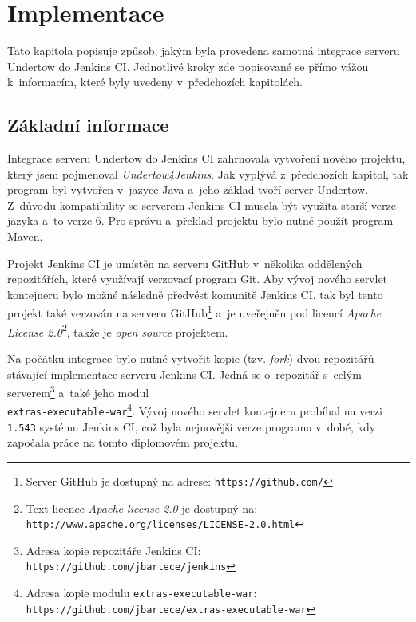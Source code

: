 \chapter{Implementace}  \label{kapImpl}
    Tato kapitola popisuje způsob, jakým byla provedena samotná integrace serveru Undertow do Jenkins CI.
    Jednotlivé kroky zde popisované se přímo vážou k~informacím, které byly uvedeny v~předchozích kapitolách.

    

    
    \section{Základní informace}
        Integrace serveru Undertow do Jenkins CI zahrnovala vytvoření nového projektu, který 
        jsem pojmenoval \emph{Undertow4Jenkins}. 
        Jak vyplývá z~předchozích kapitol, tak program byl vytvořen v~jazyce Java a~jeho základ 
        tvoří server Undertow. 
        Z~důvodu kompatibility se serverem Jenkins CI musela být využita starší verze jazyka a~to verze 6.
        Pro správu a~překlad projektu bylo nutné použít program Maven. 
        
        Projekt Jenkins CI je umístěn na serveru GitHub v~několika oddělených repozitářích, které
        využívají verzovací program Git. Aby vývoj nového servlet kontejneru bylo možné následně předvést 
        komunitě Jenkins CI, tak byl tento projekt také verzován na serveru GitHub\footnote{Server GitHub je 
        dostupný na adrese: \texttt{https://github.com/}} 
        a~je uveřejněn pod licencí \emph{Apache License 2.0}\footnote{Text licence \emph{Apache license 2.0} je dostupný na: 
        \texttt{http://www.apache.org/licenses/LICENSE-2.0.html}}, takže je \emph{open source} projektem.

        Na počátku integrace bylo nutné vytvořit kopie (tzv. \emph{fork}) dvou repozitářů stávající implementace serveru Jenkins CI.
        Jedná se o~repozitář s~celým serverem\footnote{Adresa kopie repozitáře Jenkins CI: 
        \texttt{https://github.com/jbartece/jenkins}} a~také jeho modul 
        \\\texttt{extras-executable-war}\footnote{Adresa kopie modulu \texttt{extras-executable-war}:
        \texttt{https://github.com/jbartece/extras-executable-war} }.
        Vývoj nového servlet kontejneru probíhal na verzi \texttt{1.543} systému Jenkins CI, což byla nejnovější verze
        programu v~době, kdy započala práce na tomto diplomovém projektu. 
        
